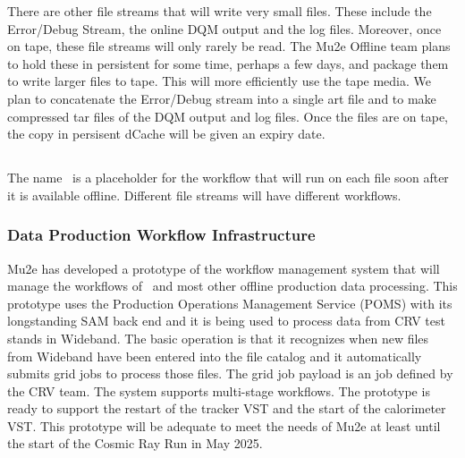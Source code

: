There are other file streams that will write very small files. These include the Error/Debug Stream, the online DQM output and the log files.  Moreover, once on tape, these file streams will only rarely be read.  The Mu2e Offline team plans to hold these in persistent for some time, perhaps a few days, and package them to write larger files to tape.  This will more efficiently use the tape media.  We plan to concatenate the Error/Debug stream into a single art file and to make compressed tar files of the DQM output and log files.   Once the files are on tape, the copy in persisent dCache will be given an expiry date.

\subsection{\passone}
\label{ssec:pass1}

The name \passone\ is a placeholder for the workflow that will run on each file soon after it is available offline.
Different file streams will have different workflows.

\subsubsection{Data Production Workflow Infrastructure}
\label{ssec:pass1:infrastructure}

Mu2e has developed a prototype of the workflow management system that will manage the workflows of \passone\ and most other offline production data processing.
This prototype uses the Production Operations Management Service (POMS) with its longstanding SAM back end and it is being used to process data from CRV test stands in Wideband.
The basic operation is that it recognizes when new files from Wideband have been entered into the file catalog and it automatically submits grid jobs to process those files.
The grid job payload is an \art job defined by the CRV team.  The system supports multi-stage workflows.
The prototype is ready to support the restart of the tracker VST and the start of the calorimeter VST. 
This prototype will be adequate to meet the needs of Mu2e at least until the start of the Cosmic Ray Run in May 2025. 

